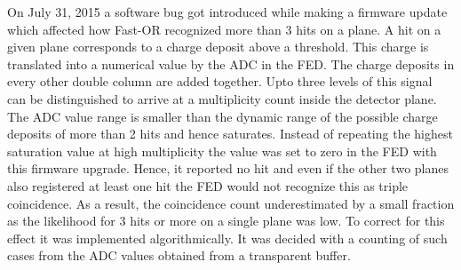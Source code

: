 On July 31, 2015 a software bug got introduced while making a firmware update which affected how Fast-OR recognized more than 3 hits on a plane. A hit on a given plane corresponds to a charge deposit above a threshold. This charge is translated into a numerical value by the ADC in the FED. The charge deposits in every other double column are added together. Upto three levels of this signal can be distinguished to arrive at a multiplicity count inside the detector plane. The ADC value range is smaller than the dynamic range of the possible charge deposits of more than 2 hits and hence saturates. Instead of repeating the highest saturation value at high multiplicity the value was set to zero in the FED with this firmware upgrade. Hence, it reported no hit and even if the other two planes also registered at least one hit the FED would not recognize this as triple coincidence. As a result, the coincidence count underestimated by a small fraction as the likelihood for 3 hits or more on a single plane was low. To correct for this effect it was implemented algorithmically. It was decided with a counting of such cases from the ADC values obtained from a transparent buffer. 




%

